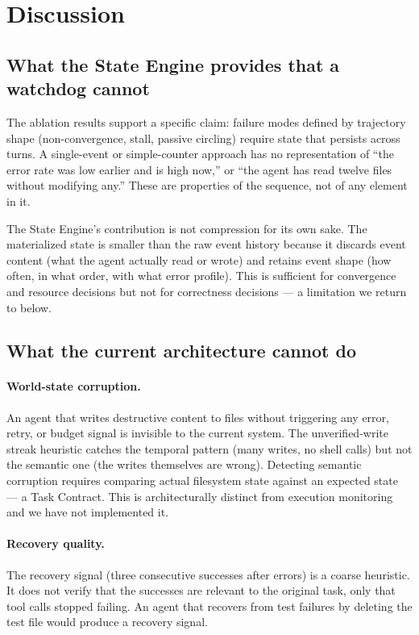 \documentclass[11pt,a4paper]{article}
\begin{document}
\section{Discussion}

\subsection{What the State Engine provides that a watchdog cannot}

The ablation results support a specific claim: failure modes defined by trajectory shape (non-convergence, stall, passive circling) require state that persists across turns. A single-event or simple-counter approach has no representation of ``the error rate was low earlier and is high now,'' or ``the agent has read twelve files without modifying any.'' These are properties of the sequence, not of any element in it.

The State Engine's contribution is not compression for its own sake. The materialized state is smaller than the raw event history because it discards event content (what the agent actually read or wrote) and retains event shape (how often, in what order, with what error profile). This is sufficient for convergence and resource decisions but not for correctness decisions --- a limitation we return to below.

\subsection{What the current architecture cannot do}

\paragraph{World-state corruption.} An agent that writes destructive content to files without triggering any error, retry, or budget signal is invisible to the current system. The unverified-write streak heuristic catches the temporal pattern (many writes, no shell calls) but not the semantic one (the writes themselves are wrong). Detecting semantic corruption requires comparing actual filesystem state against an expected state --- a Task Contract. This is architecturally distinct from execution monitoring and we have not implemented it.

\paragraph{Recovery quality.} The recovery signal (three consecutive successes after errors) is a coarse heuristic. It does not verify that the successes are relevant to the original task, only that tool calls stopped failing. An agent that recovers from test failures by deleting the test file would produce a recovery signal.
\end{document}
